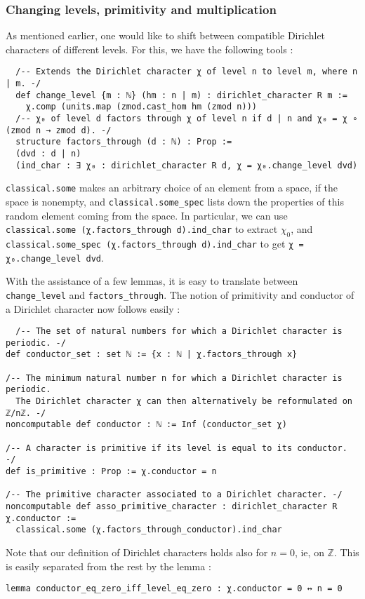 \documentclass[a4paper,UKenglish,cleveref, autoref, thm-restate]{lipics-v2021}
\newcommand{\lean}[1]{\texttt{#1}\xspace} %
\begin{document}
\subsubsection{Changing levels, primitivity and multiplication}
As mentioned earlier, one would like to shift between compatible Dirichlet characters of different levels. For this, we have the following tools : 
\begin{lstlisting}
  /-- Extends the Dirichlet character χ of level n to level m, where n | m. -/
  def change_level {m : ℕ} (hm : n | m) : dirichlet_character R m :=
    χ.comp (units.map (zmod.cast_hom hm (zmod n)))
  /-- χ₀ of level d factors through χ of level n if d | n and χ₀ = χ ∘ (zmod n → zmod d). -/
  structure factors_through (d : ℕ) : Prop :=
  (dvd : d | n)
  (ind_char : ∃ χ₀ : dirichlet_character R d, χ = χ₀.change_level dvd)
\end{lstlisting}

\lean{classical.some} makes an arbitrary choice of an element from a space, if the space
is nonempty, and \lean{classical.some\_spec} lists down the properties of this random element
coming from the space. In particular, we can use \lean{classical.some (χ.factors\_through d).ind\_char} 
to extract $\chi_0$, and \lean{classical.some\_spec (χ.factors\_through d).ind\_char} to get 
\lean{χ = χ₀.change\_level dvd}.

With the assistance of a few lemmas, it is easy to translate between \lean{change\_level} and \lean{factors\_through}. The notion of primitivity 
and conductor of a Dirichlet character now follows easily : 
\begin{lstlisting}
  /-- The set of natural numbers for which a Dirichlet character is periodic. -/
def conductor_set : set ℕ := {x : ℕ | χ.factors_through x}

/-- The minimum natural number n for which a Dirichlet character is periodic.
  The Dirichlet character χ can then alternatively be reformulated on ℤ/nℤ. -/
noncomputable def conductor : ℕ := Inf (conductor_set χ)

/-- A character is primitive if its level is equal to its conductor. -/
def is_primitive : Prop := χ.conductor = n

/-- The primitive character associated to a Dirichlet character. -/
noncomputable def asso_primitive_character : dirichlet_character R χ.conductor :=
  classical.some (χ.factors_through_conductor).ind_char
\end{lstlisting}

Note that our definition of Dirichlet characters holds also for $n = 0$, ie, on $\mathbb{Z}$. 
This is easily separated from the rest by the lemma : 
\begin{lstlisting}
lemma conductor_eq_zero_iff_level_eq_zero : χ.conductor = 0 ↔ n = 0
\end{lstlisting}
\end{document}
